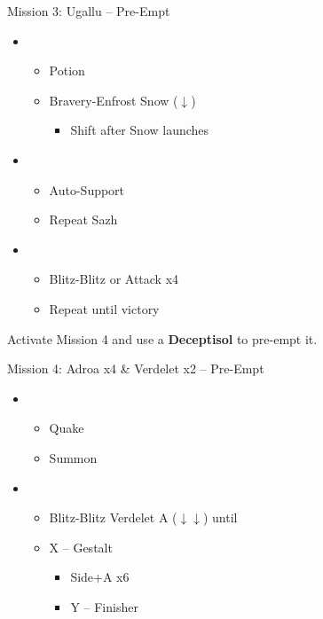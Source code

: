 \begin{battle}{Mission 3: Ugallu -- Pre-Empt}
	\begin{itemize}
		\item \third
			\begin{itemize}
				\item Potion
				\item Bravery-Enfrost Snow ($\downarrow$)
					\begin{itemize}
						\item Shift after Snow launches
					\end{itemize}
			\end{itemize}
		\item \fourth
			\begin{itemize}
				\item Auto-Support
				\item Repeat Sazh
			\end{itemize}
		\item \fifth
			\begin{itemize}
				\item Blitz-Blitz or Attack x4
				\item Repeat until victory
			\end{itemize}
	\end{itemize}
\end{battle}

Activate Mission 4 and use a \textbf{Deceptisol} to pre-empt it.

\begin{battle}{Mission 4: Adroa x4 \& Verdelet x2 -- Pre-Empt}
	\begin{itemize}
		\item \third
			\begin{itemize}
				\item Quake
				\item Summon
			\end{itemize}
		\item \fifth
			\begin{itemize}
				\item Blitz-Blitz Verdelet A ($\downarrow\downarrow$) until \stagger
				\item X -- Gestalt
					\begin{itemize}
						\item Side+A x6
						\item Y -- Finisher
					\end{itemize}
			\end{itemize}
	\end{itemize}
\end{battle}

